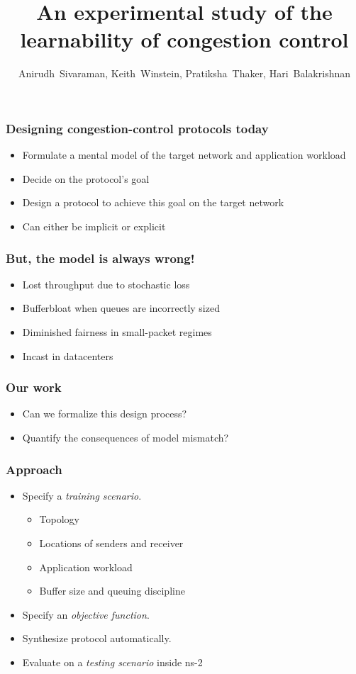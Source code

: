 \documentclass[svgnames]{beamer}
\title{An experimental study of the learnability of congestion control}
\author{Anirudh~Sivaraman, Keith~Winstein, Pratiksha~Thaker, Hari~Balakrishnan}
\institute{MIT CSAIL\vspace{\baselineskip}}
\begin{document}
\begin{frame}

\titlepage

\end{frame}

\begin{Large}
\begin{frame}
\frametitle{Designing congestion-control protocols today}
\begin{itemize}
\item Formulate a mental model of the target network and application workload
\item Decide on the protocol's goal
\item Design a protocol to achieve this goal on the target network
\item Can either be implicit or explicit
\end{itemize}
\end{frame}

\begin{frame}
\frametitle{But, the model is always wrong!}
\begin{itemize}
\item Lost throughput due to stochastic loss 
\item Bufferbloat when queues are incorrectly sized
\item Diminished fairness in small-packet regimes
\item Incast in datacenters
\end{itemize}
\end{frame}

\begin{frame}
\frametitle{Our work}
\begin{itemize}
\item Can we formalize this design process?
\item Quantify the consequences of model mismatch?
\end{itemize}
\end{frame}

\begin{frame}
\frametitle{Approach}
\begin{itemize}
\item Specify a \textit{training scenario}.
\begin{itemize}
\item Topology
\item Locations of senders and receiver
\item Application workload
\item Buffer size and queuing discipline 
\end{itemize}
\item Specify an \textit{objective function}.
\item Synthesize protocol automatically.
\item Evaluate on a \textit{testing scenario} inside ns-2
\end{itemize}
\end{frame}


\end{Large}
\end{document}
